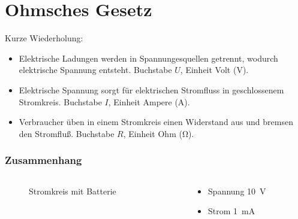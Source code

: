 
\section{Ohmsches Gesetz}
\label{section:ohmsches_gesetz}
\begin{frame}%
Kurze Wiederholung:

\begin{itemize}
  \item Elektrische Ladungen werden in Spannungesquellen getrennt, wodurch elektrische Spannung entsteht. Buchstabe $U$, Einheit Volt (V).
  \item Elektrische Spannung sorgt für elektrischen Stromfluss in geschlossenem Stromkreis. Buchstabe $I$, Einheit Ampere (A).
  \item Verbraucher üben in einem Stromkreis einen Widerstand aus und bremsen den Stromfluß. Buchstabe $R$, Einheit Ohm (Ω).
  \end{itemize}
\end{frame}

\begin{frame}
\end{frame}

\begin{frame}
\frametitle{Zusammenhang}
\begin{columns}
    \begin{column}{0.48\textwidth}
    
\begin{figure}
    \caption{\scriptsize Stromkreis mit Batterie}
    \label{n_ohmsches_gesetz_stromkreis_mit_batterie}
\end{figure}


    \end{column}
   \begin{column}{0.48\textwidth}
       \begin{itemize}
  \item Spannung 10 V
  \item Strom 1 mA
  \end{itemize}

   \end{column}
\end{columns}

\end{frame}

